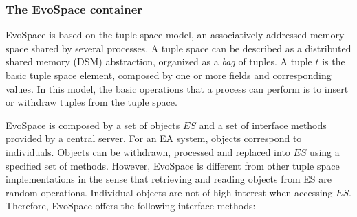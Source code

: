 \subsubsection{The EvoSpace container}
\label{sss:container}
EvoSpace is based on %
 the tuple space model, an associatively addressed
memory space shared by several processes. 
A tuple space can be described as a distributed shared memory (DSM) abstraction, organized as a \emph{bag} of tuples.
A tuple $t$ is the basic tuple space element, composed by one or more fields and corresponding values.
In this model, the basic operations that a process can perform is to
insert or withdraw tuples from the tuple space. %

EvoSpace is composed by a set of objects $ES$ and a set of interface methods provided by a central server.
For an EA system, objects correspond to individuals.
Objects can be withdrawn, processed and replaced into $ES$ using a specified set of methods.
However, EvoSpace is different from other tuple space implementations in the sense that retrieving and reading objects from ES are random operations.
Individual objects are not of high interest when accessing $ES$.
Therefore, EvoSpace offers the following interface methods:

